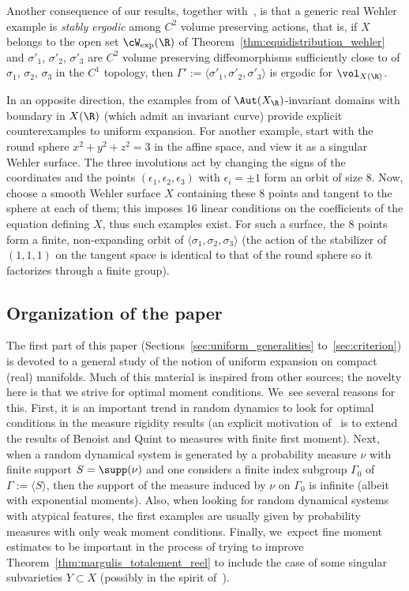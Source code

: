 Another consequence of our results, together with~\cite{dolgopyat-krikorian}, is that
a generic real Wehler example is \emph{stably ergodic} among $C^2$ volume preserving actions, that is,
if $X$ belongs to the open set $ \cW_{\mathrm{exp}}(\R)$
of Theorem~\ref{thm:equidistribution_wehler} and
$\sigma'_1$, $\sigma'_2$, $\sigma'_3$ are $C^2$
volume preserving diffeomorphisms sufficiently close to
of $\sigma_1$, $\sigma_2$, $\sigma_3$ in the $C^1$ topology, then
$\Gamma' := \langle \sigma'_1,\sigma'_2,\sigma'_3\rangle $ is ergodic for $\vol_{X(\R)}$.

In an opposite direction, the examples from \cite[\S 9]{invariant} of $\Aut(X_\R)$-invariant
domains with boundary in $X(\R)$ (which admit an invariant curve)
provide explicit counterexamples to uniform expansion.
For another example, start with the round sphere $x^2+y^2+z^2=3$ in the affine space, and view it as a singular
Wehler surface. The three involutions act by changing the signs of the coordinates and the points $(\epsilon_1,\epsilon_2,\epsilon_3)$
with $\epsilon_i=\pm 1$ form an orbit of size $8$. Now, choose a smooth Wehler surface $X$ containing these $8$ points and tangent to the sphere at each of them; this imposes $16$ linear conditions on the coefficients of the equation defining $X$, thus such examples exist.
For such a surface, the $8$ points form a finite, non-expanding orbit of $\langle\sigma_1, \sigma_2, \sigma_3\rangle$ (the action of the stabilizer of $(1,1,1)$ on the tangent space is identical to that of the round sphere so it factorizes through a finite group).

\subsection{Organization of the paper}
The first part of this paper (Sections~\ref{sec:uniform_generalities} to~\ref{sec:criterion}) is
devoted to a general study of the notion of uniform expansion on compact (real) manifolds.
Much of this material is inspired from other sources; the novelty here is that we strive for
optimal moment conditions. We~see several reasons for this. First, it is an important trend
in random dynamics to look for optimal conditions in the measure rigidity results (an explicit motivation of~\cite{Eskin-Lindenstrauss:RandomWalk} is to extend the results of Benoist and Quint to measures with finite first moment). Next,
when a random dynamical system is generated by a probability measure $\nu$ with finite support $S=\supp(\nu)$ and one considers a finite index subgroup $\Gamma_0$ of $\Gamma:=\langle S\rangle$, then the support of the measure induced by $\nu$ on $\Gamma_0$ is infinite (albeit with exponential moments). Also, when looking for random dynamical systems with atypical features, the first examples are usually given by probability measures with only weak moment conditions.
Finally, we~expect fine moment estimates to be important in the process of trying to
improve Theorem~\ref{thm:margulis_totalement_reel} to include the case of some
singular subvarieties $Y\subset X$ (possibly in the spirit of~\hbox{\cite[Th.\,B']{benard-desaxce}}).


